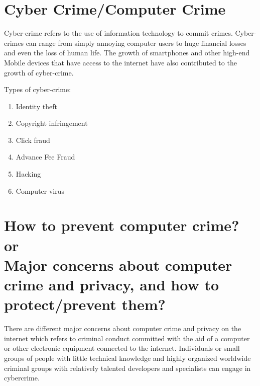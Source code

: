 \documentclass[a4paper]{article}
\begin{document}
\section{Cyber Crime/Computer Crime}
Cyber-crime refers to the use of information technology to commit crimes. Cyber-crimes can range from simply annoying computer users to huge financial losses and even the loss of human life. The growth of smartphones and other high-end Mobile devices that have access to the internet have also contributed to the growth of cyber-crime.

Types of cyber-crime:
\begin{enumerate}
  \item Identity theft
  \item Copyright infringement
  \item Click fraud
  \item Advance Fee Fraud
  \item Hacking
  \item Computer virus
\end{enumerate}

\section{How to prevent computer crime?\\or\\Major concerns about computer crime and privacy, and how to protect/prevent them?}
There are different major concerns about computer crime and privacy on the internet which refers to criminal conduct committed with the aid of a computer or other electronic equipment connected to the internet. Individuals or small groups of people with little technical knowledge and highly organized worldwide criminal groups with relatively talented developers and specialists can engage in cybercrime.
\end{document}
